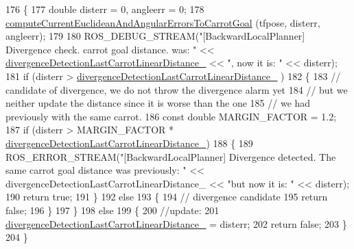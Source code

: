 \begin{DoxyCode}
176         \{
177             \textcolor{keywordtype}{double} disterr = 0, angleerr = 0;
178             \hyperlink{classcl__move__base__z_1_1backward__local__planner_1_1BackwardLocalPlanner_ad39ba029c760fc63ea286c74b5b9b795}{computeCurrentEuclideanAndAngularErrorsToCarrotGoal}
      (tfpose, disterr, angleerr);
179 
180             ROS\_DEBUG\_STREAM(\textcolor{stringliteral}{"[BackwardLocalPlanner] Divergence check. carrot goal distance. was: "} << 
      \hyperlink{classcl__move__base__z_1_1backward__local__planner_1_1BackwardLocalPlanner_a3187b3b0c9a640133556efd056f2e736}{divergenceDetectionLastCarrotLinearDistance\_} << \textcolor{stringliteral}{", now it is: "}
       << disterr);
181             \textcolor{keywordflow}{if} (disterr > \hyperlink{classcl__move__base__z_1_1backward__local__planner_1_1BackwardLocalPlanner_a3187b3b0c9a640133556efd056f2e736}{divergenceDetectionLastCarrotLinearDistance\_}
      )
182             \{
183                 \textcolor{comment}{// candidate of divergence, we do not throw the divergence alarm yet}
184                 \textcolor{comment}{// but we neither update the distance since it is worse than the one}
185                 \textcolor{comment}{// we had previously with the same carrot.}
186                 \textcolor{keyword}{const} \textcolor{keywordtype}{double} MARGIN\_FACTOR = 1.2;
187                 \textcolor{keywordflow}{if} (disterr > MARGIN\_FACTOR * 
      \hyperlink{classcl__move__base__z_1_1backward__local__planner_1_1BackwardLocalPlanner_a3187b3b0c9a640133556efd056f2e736}{divergenceDetectionLastCarrotLinearDistance\_})
188                 \{
189                     ROS\_ERROR\_STREAM(\textcolor{stringliteral}{"[BackwardLocalPlanner] Divergence detected. The same carrot goal
       distance was previously: "} << divergenceDetectionLastCarrotLinearDistance\_ << \textcolor{stringliteral}{"but now it is: "} << disterr);
190                     \textcolor{keywordflow}{return} \textcolor{keyword}{true};
191                 \}
192                 \textcolor{keywordflow}{else}
193                 \{
194                     \textcolor{comment}{// divergence candidate}
195                     \textcolor{keywordflow}{return} \textcolor{keyword}{false};
196                 \}
197             \}
198             \textcolor{keywordflow}{else}
199             \{
200                 \textcolor{comment}{//update:}
201                 \hyperlink{classcl__move__base__z_1_1backward__local__planner_1_1BackwardLocalPlanner_a3187b3b0c9a640133556efd056f2e736}{divergenceDetectionLastCarrotLinearDistance\_} = 
      disterr;
202                 \textcolor{keywordflow}{return} \textcolor{keyword}{false};
203             \}
204         \}
\end{DoxyCode}
